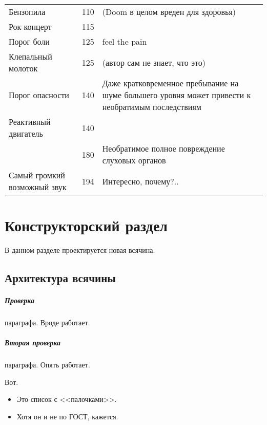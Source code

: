 \documentclass[utf8]{G7-32} %
\begin{document}
\begin{center}
\begin{longtable}{|p{}|c|p{}|}
    Бензопила                    & 110   & \small{(Doom в целом вреден для здоровья)}     \\
    Рок-концерт                  & 115   &                                                \\
    \hline
    Порог боли                   & 125   & \small{feel the pain}                          \\
    \hline
    Клепальный молоток           & 125   & \small{(автор сам не знает, что это)}          \\
    \hline
    Порог опасности              & 140   & \small{Даже кратковременное пребывание на
    шуме большего уровня может привести к необратимым последствиям}                       \\
    \hline
    Реактивный двигатель         & 140   &                                                \\
                                 & 180   & \small{Необратимое полное повреждение
                                 слуховых органов}                                        \\
    Самый громкий возможный звук & 194   & \small{Интересно, почему?..}                   \\
  \end{longtable}
\end{center}

\chapter{Конструкторский раздел}

В данном разделе проектируется новая всячина.

\section{Архитектура всячины}

\paragraph{Проверка} параграфа. Вроде работает.
\paragraph{Вторая проверка} параграфа. Опять работает.

Вот.

\begin{itemize}
\item Это список с <<палочками>>.
\item Хотя он и не по ГОСТ, кажется.
\end{itemize}
\end{document}
